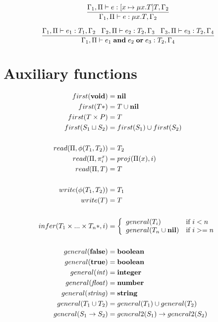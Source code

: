 \[
\dfrac{\Gamma_{1}, \Pi \vdash e:[x \mapsto \mu x.T]T, \Gamma_{2}}
      {\Gamma_{1}, \Pi \vdash e:\mu x.T, \Gamma_{2}}
\]

\[
\dfrac{\Gamma_{1}, \Pi \vdash e_{1}:T_{1}, \Gamma_{2} \;\;\;
       \Gamma_{2}, \Pi \vdash e_{2}:T_{2}, \Gamma_{3} \;\;\;
       \Gamma_{3}, \Pi \vdash e_{3}:T_{2}, \Gamma_{4}}
      {\Gamma_{1}, \Pi \vdash e_{1} \; \mathbf{and} \; e_{2} \; \mathbf{or} \; e_{3}:T_{2}, \Gamma_{4}}
\]

\section{Auxiliary functions}

\noindent

\begin{align*}
first(\Void) & = \Nil\\
first(T{*}) & = T \cup \Nil\\
first(T \times P) & = T\\
first(S_{1} \sqcup S_{2}) & = first(S_{1}) \cup first(S_{2})
\\ \\
read(\penv, \phi(T_{1},T_{2})) & = T_{2}\\
read(\penv, \pi_{i}^{x}) & = proj(\penv(x), i)\\
read(\penv, T) & = T
\\ \\
write(\phi(T_{1},T_{2})) & = T_{1}\\
write(T) & = T
\\ \\
infer(T_{1} \times ... \times T_{n}{*}, i) & = \left\{
\begin{array}{ll}
general(T_{i}) & \text{if $i < n$}\\
general(T_{n} \cup \Nil) & \text{if $i >= n$}
\end{array} \right.
\\ \\
general(\False) & = \Boolean\\
general(\True) & = \Boolean\\
general({\it int}) & = \Integer\\
general({\it float}) & = \Number\\
general({\it string}) & = \String\\
general(T_{1} \cup T_{2}) & = general(T_{1}) \cup general(T_{2})\\
general(S_{1} \rightarrow S_{2}) & = general2(S_{1}) \rightarrow general2(S_{2})\\

\end{align*}
